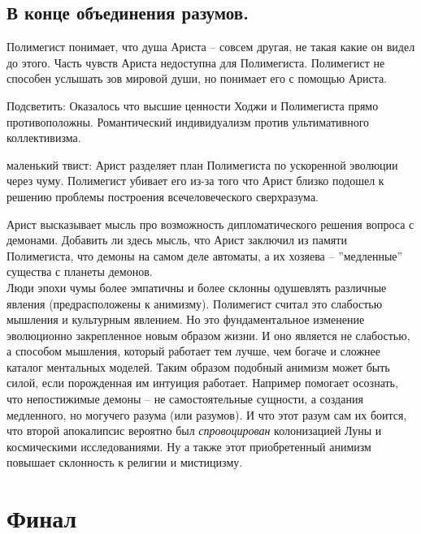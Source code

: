 \documentclass[12pt,a4paper]{article}
\newenvironment{meta}{
\begin{tcolorbox}[breakable, colback=lightgray, colframe=gray]
}{
\end{tcolorbox}
}
\begin{document}
\subsection*{В конце объединения разумов.}

\begin{meta}
Полимегист понимает, что душа Ариста -- совсем другая, не такая какие он видел до этого. Часть чувств Ариста недоступна для Полимегиста. Полимегист не способен услышать зов мировой души, но понимает его с помощью Ариста.

Подсветить: Оказалось что высшие ценности Ходжи и Полимегиста прямо противоположны. Романтический индивидуализм против ультимативного коллективизма.

маленький твист: Арист разделяет план Полимегиста по ускоренной эволюции через чуму. Полимегист убивает его из-за того что Арист близко подошел к решению проблемы построения всечеловеческого сверхразума.

Арист высказывает мысль про возможность дипломатического решения вопроса с демонами. Добавить ли здесь мысль, что Арист заключил из памяти Полимегиста, что демоны на самом деле автоматы, а их хозяева -- ''медленные'' существа с планеты демонов.\\
Люди эпохи чумы более эмпатичны и более склонны одушевлять различные явления (предрасположены к анимизму). Полимегист считал это слабостью мышления и культурным явлением. Но это фундаментальное изменение эволюционно закрепленное новым образом жизни. И оно является не слабостью, а способом мышления, который работает тем лучше, чем богаче и сложнее каталог ментальных моделей. Таким образом подобный анимизм может быть силой, если порожденная им интуиция работает. Например помогает осознать, что непостижимые демоны -- не самостоятельные сущности, а создания медленного, но могучего разума (или разумов). И что этот разум сам их боится, что второй апокалипсис вероятно был \textit{спровоцирован} колонизацией Луны и космическими исследованиями. Ну а также этот приобретенный анимизм повышает склонность к религии и мистицизму.

\end{meta}

\section*{Финал}
\end{document}
